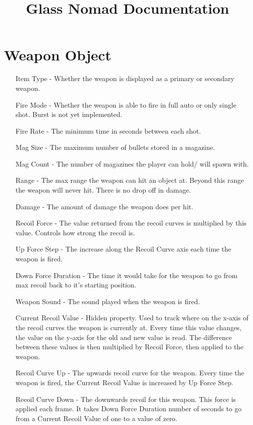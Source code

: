 \documentclass{article}
\begin{document}
    \title{Glass Nomad Documentation}

    \begin{titlepage}
        \maketitle
    \end{titlepage}

    \tableofcontents

    \newpage

    \section{Weapon Object}
    \begin{itemize}
        \item[Item Type - ] Whether the weapon is displayed as a primary or secondary weapon.
        \item[Fire Mode - ] Whether the weapon is able to fire in full auto or only single shot. Burst is not yet implemented.
        \item[Fire Rate - ] The minimum time in seconds between each shot.
        \item[Mag Size - ] The maximum number of bullets stored in a magazine.
        \item[Mag Count - ] The number of magazines the player can hold/ will spawn with.    
        \item[Range - ] The max range the weapon can hit an object at. Beyond this range the weapon will never hit. There is no drop off in damage.
        \item[Damage - ] The amount of damage the weapon does per hit.
        \item[Recoil Force - ] The value returned from the recoil curves is multiplied by this value. Controls how strong the recoil is.
        \item[Up Force Step - ] The increase along the Recoil Curve axis each time the weapon is fired.
        \item[Down Force Duration - ] The time it would take for the weapon to go from max recoil back to it's starting position.
        \item[Weapon Sound - ] The sound played when the weapon is fired.
        \item[Current Recoil Value - ] Hidden property. Used to track where on the x-axis of the recoil curves the weapon is currently at. Every time this value changes, the value on the y-axis for the old and new value is read. The difference between these values is then multiplied by Recoil Force, then applied to the weapon.
        \item[Recoil Curve Up - ] The upwards recoil curve for the weapon. Every time the weapon is fired, the Current Recoil Value is increased by Up Force Step.
        \item[Recoil Curve Down - ] The downwards recoil for this weapon. This force is applied each frame. It takes Down Force Duration number of seconds to go from a Current Recoil Value of one to a value of zero.
    \end{itemize}
\end{document}
